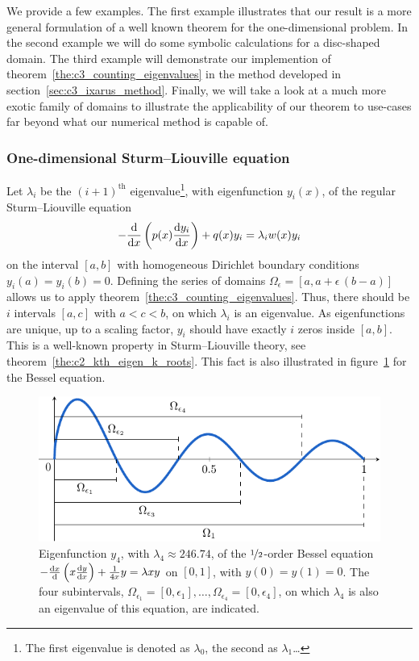 We provide a few examples. The first example illustrates that our result is a more general formulation of a well known theorem for the one-dimensional problem. In the second example we will do some symbolic calculations for a disc-shaped domain. The third example will demonstrate our implemention of theorem~\ref{the:c3_counting_eigenvalues} in the method developed in section~\ref{sec:c3_ixarus_method}. Finally, we will take a look at a much more exotic family of domains to illustrate the applicability of our theorem to use-cases far beyond what our numerical method is capable of.

\subsubsection{One-dimensional Sturm--Liouville equation}

Let $\lambda_i$ be the $(i+1)^{\text{th}}$ eigenvalue\footnote{The first eigenvalue is denoted as $\lambda_0$, the second as $\lambda_1$\dots}, with eigenfunction $y_i(x)$, of the regular Sturm--Liouville equation
$$
  -\dv{x} \left( p(x) \dv{y_i}{x} \right) + q(x) y_i = \lambda_i w(x) y_i
$$
on the interval $[a, b]$ with homogeneous Dirichlet boundary conditions $y_i(a) = y_i(b) = 0$. Defining the series of domains $\Omega_\epsilon = [a, a + \epsilon\,(b-a)]$ allows us to apply theorem~\ref{the:c3_counting_eigenvalues}. Thus, there should be $i$ intervals $[a, c]$ with $a < c < b$, on which $\lambda_i$ is an eigenvalue. As eigenfunctions are unique, up to a scaling factor, $y_i$ should have exactly $i$ zeros inside $[a, b]$. This is a well-known property in Sturm--Liouville theory, see theorem~\ref{the:c2_kth_eigen_k_roots}. This fact is also illustrated in figure~\ref{fig:c3_counting_sturm_liouville} for the Bessel equation.

\begin{figure}
  \begin{center}
    \includegraphics[width=.9\textwidth]{img/chapter3/counting/sturm-liouville.pdf}
    \caption{Eigenfunction $y_4$, with $\lambda_4 \approx 246.74$, of the $\nicefrac{1}{2}$-order Bessel equation~\cite{titchmarsh_eigenfunction_1962} $-\dv{x}{} \left( x \dv{y}{x} \right) + \frac{1}{4x} y = \lambda x y $ on $[0, 1]$, with $y(0) = y(1) = 0$. The four subintervals, $\Omega_{\epsilon_1} = [0, \epsilon_1],\dots, \Omega_{\epsilon_4} = [0, \epsilon_4]$, on which $\lambda_4$ is also an eigenvalue of this equation, are indicated.}\label{fig:c3_counting_sturm_liouville}
  \end{center}
\end{figure}

